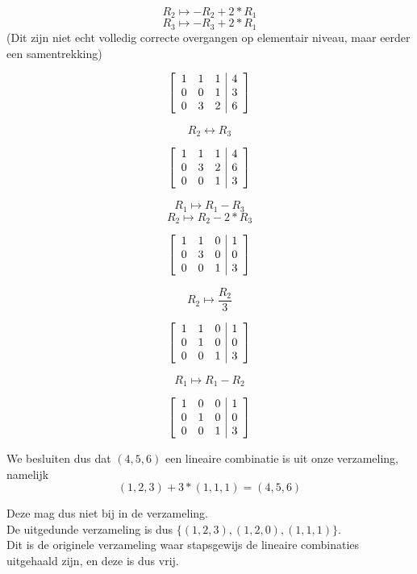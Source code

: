 \documentclass[lineaire_algebra_oplossingen.tex]{subfiles}
\begin{document}
\[R_2 \mapsto -R_2 + 2*R_1 \]
\[R_3 \mapsto -R_3 + 2*R_1 \]
(Dit zijn niet echt volledig correcte overgangen op elementair niveau, maar eerder een samentrekking)

\[
\left[
\begin{array}{c c c | c}
1 & 1 & 1 & 4\\
0 & 0 & 1 & 3\\
0 & 3 & 2 & 6
\end{array}
\right]
\]

\[R_2 \leftrightarrow R_3\]

\[
\left[
\begin{array}{c c c | c}
1 & 1 & 1 & 4\\
0 & 3 & 2 & 6\\
0 & 0 & 1 & 3
\end{array}
\right]
\]

\[R_1 \mapsto R_1 - R_3 \]
\[R_2 \mapsto R_2 - 2*R_3 \]

\[
\left[
\begin{array}{c c c | c}
1 & 1 & 0 & 1\\
0 & 3 & 0 & 0\\
0 & 0 & 1 & 3
\end{array}
\right]
\]

\[R_2 \mapsto \frac{R_2}{3}\]

\[
\left[
\begin{array}{c c c | c}
1 & 1 & 0 & 1\\
0 & 1 & 0 & 0\\
0 & 0 & 1 & 3
\end{array}
\right]
\]

\[R_1 \mapsto R_1 - R_2\]

\[
\left[
\begin{array}{c c c | c}
1 & 0 & 0 & 1\\
0 & 1 & 0 & 0\\
0 & 0 & 1 & 3
\end{array}
\right]
\]

We besluiten dus dat $(4,5,6)$ een lineaire combinatie is uit onze verzameling, namelijk\\

\[
(1,2,3) + 3 * (1,1,1) = (4,5,6)
\]

Deze mag dus niet bij in de verzameling.\\

De uitgedunde verzameling is dus $\{(1,2,3), (1,2,0), (1,1,1)\}$.\\

Dit is de originele verzameling waar stapsgewijs de lineaire combinaties uitgehaald zijn, en deze is dus vrij.
\end{document}
